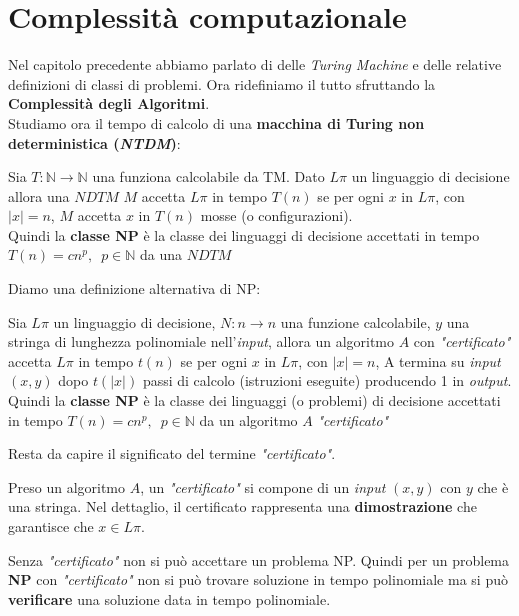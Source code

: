 \chapter{Complessità computazionale}
Nel capitolo precedente abbiamo parlato di delle \textit{Turing Machine} e delle relative definizioni di classi di problemi. Ora ridefiniamo il tutto sfruttando la \textbf{Complessità degli Algoritmi}.\\
Studiamo ora il tempo di calcolo di una \textbf{macchina di Turing non
 deterministica (\textit{NTDM})}:
\begin{definizione}
  Sia $T:\mathbb{N}\to\mathbb{N}$ una funziona calcolabile da TM. Dato $L\pi$ un
  linguaggio di decisione allora una $NDTM$ $M$ accetta $L\pi$ in tempo
  $T(n)$ se per ogni $x$ in $L\pi$, con $|x|=n$,  $M$ accetta $x$ in $T(n)$
  mosse (o configurazioni).\\
  Quindi la \textbf{classe NP} è la classe dei linguaggi di decisione accettati
  in tempo $T(n)=cn^p,\,\,\,p\in \mathbb{N}$ da una $NDTM$
\end{definizione}
Diamo una definizione alternativa di NP:
\begin{definizione}
  Sia $L\pi$ un linguaggio di decisione, $N:n\to n$ una funzione calcolabile,
  $y$ una stringa di lunghezza polinomiale nell'\textit{input}, allora un algoritmo $A$
  con \textit{"certificato"} accetta $L\pi$ in tempo $t(n)$ se per ogni $x$ in $L\pi$,
  con $|x|=n$, A termina su \textit{input} $(x,y)$ dopo $t(|x|)$ passi di calcolo
  (istruzioni eseguite) producendo 1 in \textit{output}.
  Quindi la \textbf{classe NP} è la classe dei linguaggi (o problemi) di
  decisione accettati in tempo $T(n)=cn^p,\,\,\,p\in\mathbb{N}$ da un algoritmo
  $A$ \textit{"certificato"}
\end{definizione}
Resta da capire il significato del termine \textit{"certificato"}.
\begin{definizione}
  Preso un algoritmo $A$, un \textit{"certificato"} si
  compone di un \textit{input} $(x,y)$ con $y$ che è una stringa. Nel dettaglio, il certificato rappresenta una
  \textbf{dimostrazione} che garantisce che $x\in L\pi$.
\end{definizione}
\begin{definizione}
Senza \textit{"certificato"} non si può accettare un problema NP. Quindi per un problema \textbf{NP} con \textit{"certificato"} non si può trovare
soluzione in tempo polinomiale ma si può \textbf{verificare} una soluzione data in tempo polinomiale.
\end{definizione}
